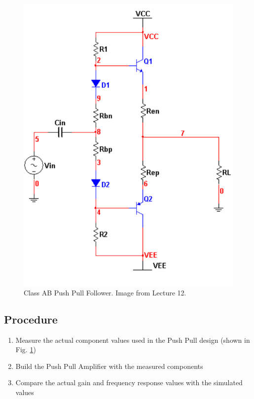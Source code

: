 \documentclass[12pt,letterpaper]{report}
\newlength \figwidth
\begin{document}
\begin{figure}[H]
\centering
\includegraphics[width=\figwidth, keepaspectratio=true]{lab7_images/push_pull.png}
\caption{Class AB Push Pull Follower. Image from Lecture 12.}
\label{fig:push_pull}
\end{figure}

\subsection*{Procedure}

\begin{enumerate}
\item Measure the actual component values used in the Push Pull design (shown in Fig. \ref{fig:push_pull})
\item Build the Push Pull Amplifier with the measured components
\item Compare the actual gain and frequency response values with the simulated values
\end{enumerate}
\end{document}
